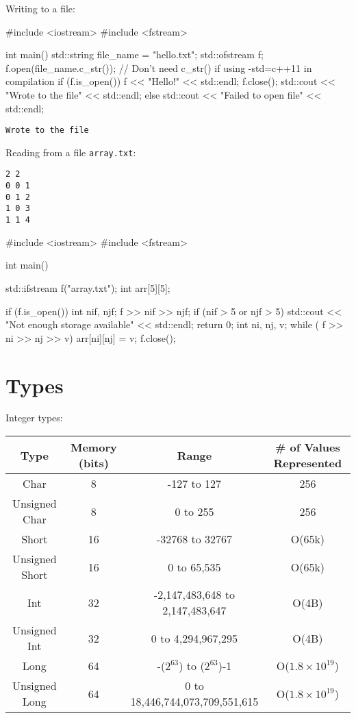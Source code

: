 \documentclass[12pt,letterpaper,twoside]{article}
\begin{document}
Writing to a file:
\begin{cpp}
#include <iostream>
#include <fstream>

int main() {
  std::string file_name = "hello.txt";
  std::ofstream f;
  f.open(file_name.c_str()); // Don't need c_str() if using -std=c++11 in compilation 
  if (f.is_open()){
    f << "Hello!" << std::endl;
    f.close();
    std::cout << "Wrote to the file" << std::endl;
  }
  else {
    std::cout << "Failed to open file" << std::endl;
  }
}
\end{cpp}
\vspace{-3ex}
{\footnotesize
\begin{verbatim}
Wrote to the file
\end{verbatim}
}


Reading from a file \texttt{array.txt}:
{\footnotesize
\begin{verbatim}
2 2
0 0 1
0 1 2
1 0 3
1 1 4
\end{verbatim}
}

\begin{cpp}
#include <iostream>
#include <fstream>

int main() {
  std::ifstream f("array.txt");
  int arr[5][5];

  if (f.is_open()) {
    int nif, njf; 
    f >> nif >> njf;
    if (nif > 5 or njf > 5) {
      std::cout << "Not enough storage available" << std::endl;
      return 0;
    }
    int ni, nj, v;
    while ( f >> ni >> nj >> v){
      arr[ni][nj] = v;
    }
    f.close();
  }
 }
\end{cpp}

\newpage
\section{Types}

Integer types:
\begin{table}[!h]
\centering
\begin{tabular}{c|c|c|c}
Type & Memory (bits) & Range & \# of Values Represented   \\\hline \hline 
Char & 8 & -127 to 127 & 256\\
Unsigned Char & 8 & 0 to 255 & 256  \\ \hline
Short & 16 & -32768 to 32767 & O(65k) \\
Unsigned Short & 16 & 0 to 65,535 & O(65k) \\ \hline
Int & 32 & -2,147,483,648 to 2,147,483,647 & O(4B) \\ 
Unsigned Int & 32 & 0 to 4,294,967,295 & O(4B) \\\hline
Long & 64 & -($2^{63}$) to ($2^{63}$)-1 & O($1.8\times 10^{19}$) \\
Unsigned Long & 64 & 0 to 18,446,744,073,709,551,615 & O($1.8\times 10^{19}$) \\ \hline
\end{tabular}
\end{table}
\end{document}
